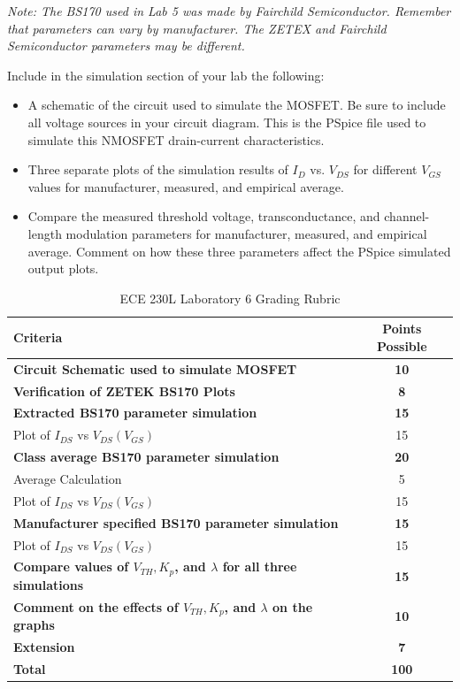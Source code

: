 \documentclass[12pt]{../manual}
\begin{document}
\textit{Note: The BS170 used in Lab 5 was made by Fairchild Semiconductor. Remember that parameters can vary by manufacturer. The ZETEX and Fairchild Semiconductor parameters may be different.}

Include in the simulation section of your lab the following:
\begin{itemize}
\item A schematic of the circuit used to simulate the MOSFET. Be sure to include all voltage sources in your circuit diagram. This is the PSpice file used to simulate this NMOSFET drain-current characteristics.
\item Three separate plots of the simulation results of $I_D$ vs. $V_{DS}$ for different $V_{GS}$ values for manufacturer, measured, and empirical average.
\item Compare the measured threshold voltage, transconductance, and channel-length modulation parameters for manufacturer, measured, and empirical average. Comment on how these three parameters affect the PSpice simulated output plots.
\end{itemize}

%
\newpage
\def\arraystretch{1.2}
{}
\hspace{0pt}
\vfill %
\begin{table}[ht!]
\caption{ECE 230L Laboratory 6 Grading Rubric}
\centering
\begin{tabular}{l|c} \hline
Criteria & Points Possible \\ \hline \hline
\textbf{Circuit Schematic used to simulate MOSFET}	& \textbf{10} \\ \hline
\textbf{Verification of ZETEK BS170 Plots}			& \textbf{8} \\ \hline
\textbf{Extracted BS170 parameter simulation}		& \textbf{15} \\
Plot of $I_{DS}$ vs $V_{DS}(V_{GS})$ 				& 15 \\ \hline
\textbf{Class average BS170 parameter simulation}	& \textbf{20} \\
Average Calculation									& 5 \\ 
Plot of $I_{DS}$ vs $V_{DS}(V_{GS})$ 				& 15 \\ \hline
\textbf{Manufacturer specified BS170 parameter simulation}		& \textbf{15} \\
Plot of $I_{DS}$ vs $V_{DS}(V_{GS})$ 				& 15 \\ \hline
\textbf{Compare values of $V_{TH}, K_p$, and $\lambda$ for all three simulations} & \textbf{15} \\ \hline
\textbf{Comment on the effects of $V_{TH}, K_p$, and $\lambda$ on the graphs} & \textbf{10} \\ \hline
{\bf Extension} 									& {\bf 7} \\ \hline \hline
{\bf Total}											& {\bf 100} \\ \hline
\end{tabular}
\end{table}
\vfill %
\end{document}
